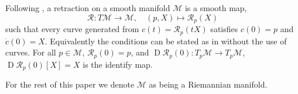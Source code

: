 \begin{definition}[Retraction]\label{def:retraction}
    Following \cite[Def.~3.47]{Boumal2023}, a retraction on a smooth manifold $\mathcal{M}$ is a smooth map,
    $$\mathcal{R}:T \mathcal{M}\xrightarrow{}\mathcal{M},\quad(p,X)\mapsto \mathcal{R}_{p}(X)$$
    such that every curve generated from $c(t)=\mathcal{R}_{p}(tX)$ satisfies $c(0)=p$ and $\dot{c}(0)=X$. Equivalently the conditions can be stated as in \cite[p.~40]{Boumal2023} without the use of curves. For all $p\in \mathcal{M}$, $\mathcal{R}_{p}(0)=p$, and $\operatorname{D}\mathcal{R}_{p}(0):T_{p}\mathcal{M}\xrightarrow{}T_{p}\mathcal{M}$, $\operatorname{D}\mathcal{R}_{p}(0)[X]=X$ is the identify map. 
\end{definition}

\begin{definition}[]\label{def:}
    
\end{definition}

\begin{definition}[]\label{def:}
    
\end{definition}
    



For the rest of this paper we denote $\mathcal{M}$ as being a Riemannian manifold.










